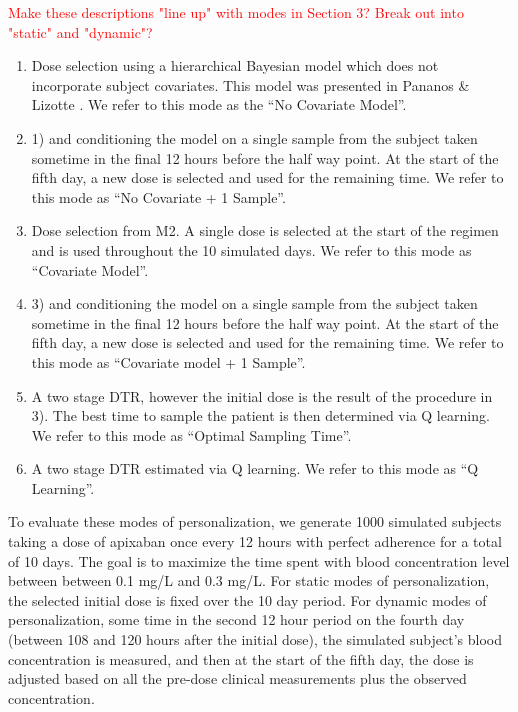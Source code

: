 \textcolor{red}{Make these descriptions "line up" with modes in Section 3? Break out into "static" and "dynamic"?}
\begin{enumerate}[1)]
\item Dose selection using a hierarchical Bayesian model which does not incorporate subject covariates.  This model was presented in Pananos \& Lizotte \cite{pananos2020comparisons}.  We refer to this mode as the “No Covariate Model”.
\item 1) and conditioning the model on a single sample from the subject taken sometime in the final 12 hours before the half way point.  At the start of the fifth day, a new dose is selected and used for the remaining time.  We refer to this mode as “No Covariate + 1 Sample”.
\item Dose selection from M2.  A single dose is selected at the start of the regimen and is used throughout the 10 simulated days. We refer to this mode as “Covariate Model”.
\item 3) and conditioning the model on a single sample from the subject taken sometime in the final 12 hours before the half way point.  At the start of the fifth day, a new dose is selected and used for the remaining time. We refer to this mode as “Covariate model + 1 Sample”.
\item A two stage DTR, however the initial dose is the result of the procedure in 3).  The best time to sample the patient is then determined via Q learning. We refer to this mode as “Optimal Sampling Time”.
\item A two stage DTR estimated via Q learning.  We refer to this mode as “Q Learning”.
\end{enumerate}

To evaluate these modes of personalization, we generate 1000 simulated subjects taking a dose of apixaban once every 12 hours with perfect adherence for a total of 10 days. The goal is to maximize the time spent with blood concentration level between between 0.1 mg/L and 0.3 mg/L. For static modes of personalization, the selected initial dose is fixed over the 10 day period. For dynamic modes of personalization, some time in the second 12 hour period on the fourth day (between 108 and 120 hours after the initial dose), the simulated subject’s blood concentration is measured, and then at the start of the fifth day, the dose is adjusted based on all the pre-dose clinical measurements plus the observed concentration. 


